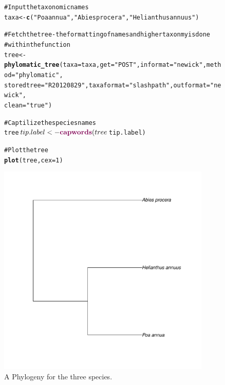 \documentclass[letterpaper,superscriptaddress,showkeys,longbibliography,10pt]{revtex4-1}\usepackage{graphicx, color}
\makeatletter
\newcommand{\hlfunctioncall}[1]{\textcolor[rgb]{0.501960784313725,0,0.329411764705882}{\textbf{#1}}}%
\newcommand{\hlstring}[1]{\textcolor[rgb]{0.6,0.6,1}{#1}}%
\newcommand{\hlcomment}[1]{\textcolor[rgb]{0.180392156862745,0.6,0.341176470588235}{#1}}%
\newenvironment{kframe}{%
 \def\at@end@of@kframe{}%
 \ifinner\ifhmode%
  \def\at@end@of@kframe{\end{minipage}}%
  \begin{minipage}{\columnwidth}%
 \fi\fi%
 \def\FrameCommand##1{\hskip\@totalleftmargin \hskip-\fboxsep
 \colorbox{shadecolor}{##1}\hskip-\fboxsep
     \hskip-\linewidth \hskip-\@totalleftmargin \hskip\columnwidth}%
 \MakeFramed {\advance\hsize-\width
   \@totalleftmargin\z@ \linewidth\hsize
   \@setminipage}}%
 {\par\unskip\endMakeFramed%
 \at@end@of@kframe}
\newenvironment{knitrout}{}{} %
\makeatother
\begin{document}
\begin{figure}[H] 
\centering 
\begin{knitrout}
\color{fgcolor}\begin{kframe}
\begin{alltt}
\hlcomment{# Input the taxonomic names}
taxa <- \hlfunctioncall{c}(\hlstring{"Poa annua"}, \hlstring{"Abies procera"}, \hlstring{"Helianthus annuus"})

\hlcomment{# Fetch the tree - the formatting of names and higher taxonmy is done}
\hlcomment{# within the function}
tree <- \hlfunctioncall{phylomatic_tree}(taxa = taxa, get = \hlstring{"POST"}, informat = \hlstring{"newick"}, method = \hlstring{"phylomatic"}, 
    storedtree = \hlstring{"R20120829"}, taxaformat = \hlstring{"slashpath"}, outformat = \hlstring{"newick"}, 
    clean = \hlstring{"true"})

\hlcomment{# Captilize the species names}
tree$tip.label <- \hlfunctioncall{capwords}(tree$tip.label)

\hlcomment{# Plot the tree}
\hlfunctioncall{plot}(tree, cex = 1)
\end{alltt}
\end{kframe}

{\centering \includegraphics[width=4in,height=4in]{figure/phylomaticphylogeny} 

}



\end{knitrout}

\caption{A Phylogeny for the three species.} 
\label{fig:phylomatic}
\end{figure} 
\end{document}
